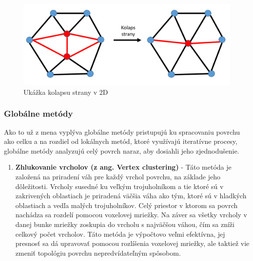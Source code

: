 \begin{enumerate}
    \begin{figure}[!htbp]
      \centering
      \includegraphics[width=12 cm]{img/edge_collapse.png}
      \caption{Ukážka kolapsu strany v 2D} 
      \label{fig:Edge_collapse}
    \end{figure} 
\end{enumerate}

\subsubsection{Globálne metódy}
\noindent Ako to už z mena vyplýva globálne metódy pristupujú ku spracovaniu povrchu ako celku a na rozdiel od lokálnych metód, ktoré využívajú iteratívne procesy, globálne metódy analyzujú celý povrch naraz, aby dosiahli jeho zjednodušenie.
\begin{enumerate}
    \item\textbf{Zhlukovanie vrcholov (z ang. Vertex clustering)} - Táto metóda je založená na priradení váh pre každý vrchol povrchu, na základe jeho dôležitosti. Vrcholy susedné ku veľkým trojuholníkom a tie ktoré sú v zakrivených oblastiach je priradená väčšia váha ako tým, ktoré sú v hladkých oblastiach a vedľa malých trojuholníkov. Celý priestor v ktorom sa povrch nachádza sa rozdelí pomocou voxelovej mriežky. Na záver sa všetky vrcholy v danej bunke mriežky zoskupia do vrcholu s najväčšou váhou, čím sa zníži celkový počet vrcholov. Táto metóda je výpočtovo veľmi efektívna, jej presnosť sa dá upravovať pomocou rozlíšenia voxelovej mriežky, ale taktiež vie zmeniť topológiu povrchu nepredvídateľným spôsobom. \cite{mesh_simplification}
\end{enumerate}

